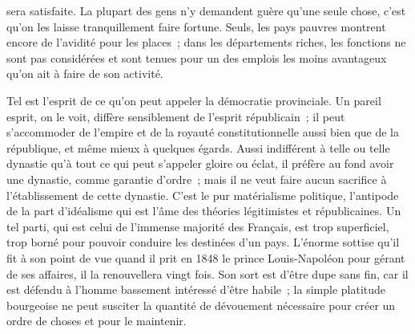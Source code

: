 \documentclass[french,twoside]{book} %
\begin{document}
sera satisfaite. La plupart des gens n’y demandent guère qu’une seule chose, c’est qu’on les laisse tranquillement faire fortune. Seuls, les pays pauvres montrent encore de l’avidité pour les places ; dans les départements riches, les fonctions ne sont pas considérées et sont tenues pour un des emplois les moins avantageux qu’on ait à faire de son activité.\par
Tel est l’esprit de ce qu’on peut appeler la démocratie provinciale. Un pareil esprit, on le voit, diffère sensiblement de l’esprit républicain ; il peut s’accommoder de l’empire et de la royauté constitutionnelle aussi bien que de la république, et même mieux à quelques égards. Aussi indifférent à telle ou telle dynastie qu’à tout ce qui peut s’appeler gloire ou éclat, il préfère au fond avoir une dynastie, comme garantie d’ordre ; mais il ne veut faire aucun sacrifice à l’établissement de cette dynastie. C’est le pur matérialisme politique, l’antipode de la part d’idéalisme qui est l’âme des théories légitimistes et républicaines. Un tel parti, qui est celui de l’immense majorité des Français, est trop superficiel, trop borné pour pouvoir conduire les destinées d’un pays. L’énorme sottise qu’il fit à son point de vue quand il prit en 1848 le prince Louis-Napoléon pour gérant de ses affaires, il la renouvellera vingt fois. Son sort est d’être dupe sans fin, car il est défendu à l’homme bassement intéressé d’être habile ; la simple platitude bourgeoise ne peut susciter la quantité de dévouement nécessaire pour créer un ordre de choses et pour le maintenir.\par
\end{document}
